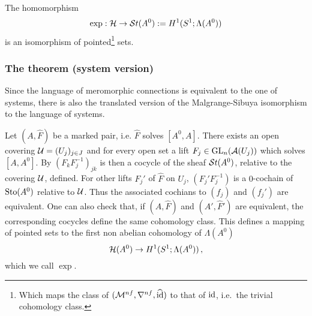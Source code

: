 \begin{tthm} \label{thm:mainThm1}
  The homomorphism
  \[
    \exp:\mathcal{H}\to\mathcal{S}{}t(A^0):=H^1(S^1;\Lambda(A^0))
  \]
  is an isomorphism of pointed\footnote{Which maps the class of
  $(\mathcal{M}^{nf},\nabla^{nf},\widehat{\operatorname{id}})$ to that of $\operatorname{id}$, i.e.\ the trivial
  cohomology class.} sets.
\end{tthm}
\begin{comment}
  \begin{rem}
    \marginnote{\cite{Loday1994} Remark I.2.2}
    To another normal form $A^1={}^\Phi\!A^0$ there correspond cochains which
    are conjugated via $\Phi$.
    We get the following commutative diagram:
    \[ \begin{tikzcd}
        G\backslash\hat G(A^1) \rar{\cdot\Phi}\dar{\exp}
        & G\backslash\hat G(A^0) \dar{\exp}
        & \hat F \arrow[|->]{r}\arrow[|->]{d}
        & \hat F\Phi \arrow[|->]{d}
      \\ H^1(S^1;\lambda(A^1)) \rar
        & H^1(S^1;\lambda(A^0))
        & \exp_{\mu_1}(\hat F) \arrow[|->]{r}
        & \exp_{\mu_0}(\hat F\Phi)
    \end{tikzcd} \]
    where $\exp_{\mu_0}(\hat F\Phi)=\Phi^{-1}\exp_{\mu_0}(\hat F)\Phi$.
  \end{rem}
\end{comment}

\subsubsection{The theorem (system version)}
Since the language of meromorphic connections is equivalent to the one of
systems, there is also the translated version of the Malgrange-Sibuya
isomorphism to the language of systems.
\begin{comment}
  \begin{itemize}
    \item \TODO[See \cite{thboalch} for sheaf-less definition]
  \end{itemize}
\end{comment}
Let $(A,\hat F)$ be a marked pair, i.e. $\hat F$ solves $[A^0,A]$.
There exists an open covering $\mathcal{U}=(U_j)_{j\in J}$ and for every open set
a lift $F_j\in\operatorname{GL}_n(\mathcal{A}(U_j))$ which solves $[A,A^0]$.
By $(F_kF_j^{-1})_{jk}$ is then a cocycle of the sheaf $\mathcal{S}{}t(A^0)$, relative to
the covering $\mathcal{U}$, defined.
For other lifts $F_j'$ of $\hat F$ on $U_j$, $(F_j'F_j^{-1})$ is a $0$-cochain
of $\operatorname{Sto}(A^0)$ relative to $\mathcal{U}$.
Thus the associated cochians to $(f_j)$ and $(f_j')$ are equivalent.
One can also check that, if $(A,\hat F)$ and $(A',\hat F')$ are equivalent, the
corresponding cocycles define the same cohomology class.
This defines a mapping of pointed sets to the first non abelian cohomology of
$\Lambda(A^0)$
\[
  \mathcal{H}(A^0)\to H^1(S^1;\Lambda(A^0)) \,,
\]
which we call $\exp$.

